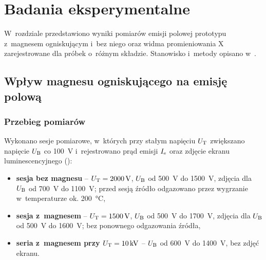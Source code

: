 \chapter{Badania eksperymentalne}
\label{ch:badania}

\renewcommand{\figdir}{../emisja-magnes-pomiary/figures}
\renewcommand{\datadir}{../emisja-magnes-pomiary/dane}
\providecommand{\sesjaM}{z~magnesem}
\providecommand{\sesjaB}{bez magnesu}

W~rozdziale przedstawiono wyniki pomiarów emisji polowej prototypu
z~magnesem ogniskującym i~bez niego oraz widma promieniowania X
zarejestrowane dla próbek o~różnym składzie. Stanowisko i~metody opisano
w~.

\section{Wpływ magnesu ogniskującego na emisję polową}
\label{sec:emisja-magnes}

\subsection{Przebieg pomiarów}

Wykonano sesje pomiarowe, w~których przy stałym napięciu $U_\mathrm{T}$
zwiększano napięcie $U_\mathrm{B}$ co \SI{100}{V} i~rejestrowano prąd emisji
$I_\mathrm{e}$ oraz zdjęcie ekranu luminescencyjnego ():
\begin{itemize}
  \item \textbf{sesja bez magnesu} -- $U_\mathrm{T}=\SI{2000}{V}$,
        $U_\mathrm{B}$ od \SI{500}{V} do \SI{1500}{V}, zdjęcia dla $U_\mathrm{B}$ od
        \SI{700}{V} do \SI{1100}{V}; przed sesją źródło odgazowano
        przez wygrzanie w~temperaturze ok. \SI{200}{\celsius},
  \item \textbf{sesja z~magnesem} -- $U_\mathrm{T}=\SI{1500}{V}$,
        $U_\mathrm{B}$ od \SI{500}{V} do \SI{1700}{V}, zdjęcia dla $U_\mathrm{B}$ od
        \SI{500}{V} do \SI{1600}{V}; bez ponownego odgazowania źródła,
  \item \textbf{seria z~magnesem przy $U_\mathrm{T}=\SI{10}{kV}$} --
        $U_\mathrm{B}$ od \SI{600}{V} do \SI{1400}{V}, bez zdjęć ekranu.
\end{itemize}

